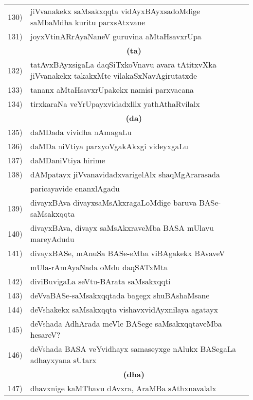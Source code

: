 {\begin{longtable}{@{}cp{7.4cm}r}
130) & jiVvanakekx saMsakxqqta vidAyxBAyxsadoMdige saMbaMdha kuritu parxsAtxvane & \pageref{page38}\\
131) & joyxVtinARrAyaNaneV guruvina aMtaHsavxrUpa & \pageref{80e}\\[0.3cm]
     &  \multicolumn{1}{c}{\textbf{(ta)}}  & \\[0.3cm]    
132) & tatAvxBAyxsigaLa daqSiTxkoVnavu avara tAtitxvXka jiVvanakekx takakxMte vilakaSxNavAgirutatxde & \pageref{page175}\\
133) & tananx aMtaHsavxrUpakekx namisi parxvacana & \pageref{80b}\\
134) & tirxkaraNa veYrUpayxvidadxlilx yathAthaRvilalx & \pageref{page69}\\[0.3cm]
     &  \multicolumn{1}{c}{\textbf{(da)}}  & \\[0.3cm]
135) & daMDada vividha nAmagaLu &  \pageref{page100}\\
136) & daMDa niVtiya parxyoVgakAkxgi videyxgaLu & \pageref{page99}\\
137) & daMDaniVtiya hirime & \pageref{page96} \\
138) & dAMpatayx jiVvanavidadxvarigelAlx shaqMgArarasada & \pageref{page221}\\
     & paricayavide enanxlAgadu & \pageref{page221}\\
139) & divayxBAva divayxsaMsAkxragaLoMdige baruva BASe-saMsakxqqta & \pageref{page10}\\
140) & divayxBAva, divayx saMsAkxraveMba BASA mUlavu mareyAdudu & \pageref{page15}\\
141) & divayxBASe, mAnuSa BASe-eMba viBAgakekx BAvaveV &  \\
     & mUla-rAmAyaNada oMdu daqSATxMta & \pageref{page14}\\
142) & diviBuvigaLa seVtu-BArata saMsakxqqti & \pageref{page23}\\
143) & deVvaBASe-saMsakxqqtada bagegx shuBAshaMsane & \pageref{20b}\\
144) & deVshakekx saMsakxqqta vishavxvidAyxnilaya agatayx & \pageref{page37}\\
145) & deVshada AdhArada meVle BASege saMsakxqqtaveMba hesareV? & \pageref{page7}\\
146) & deVshada BASA veYvidhayx samaseyxge nAlukx BASegaLa adhayxyana sUtarx &\pageref{page44}\\[0.3cm]     
     &    \multicolumn{1}{c}{\textbf{(dha)}}  & \\[0.3cm] 
147) & dhavxnige kaMThavu dAvxra, AraMBa sAthxnavalalx & \pageref{page171}\\

\end{longtable}}

